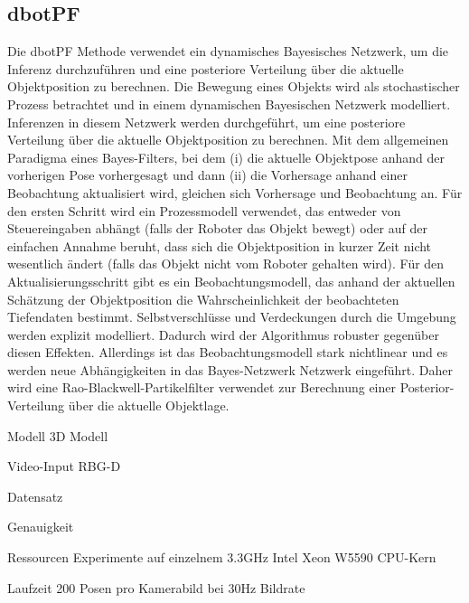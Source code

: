 \documentclass[a4paper, 11pt]{article}
\begin{document}
\begin{multicols*}{2}
    \subsection{dbotPF}
    Die dbotPF\cite{dbotPF} Methode verwendet ein dynamisches Bayesisches Netzwerk, um die Inferenz durchzuführen und eine posteriore Verteilung über die aktuelle Objektposition zu berechnen.
    Die Bewegung eines Objekts wird als stochastischer Prozess betrachtet und in einem dynamischen Bayesischen Netzwerk modelliert. Inferenzen in diesem Netzwerk werden durchgeführt, um eine posteriore Verteilung über die aktuelle Objektposition zu berechnen.
    Mit dem allgemeinen Paradigma eines Bayes-Filters, bei dem (i) die aktuelle Objektpose anhand der vorherigen Pose vorhergesagt und dann (ii) die Vorhersage anhand einer Beobachtung aktualisiert wird, gleichen sich Vorhersage und Beobachtung an.
    Für den ersten Schritt wird ein Prozessmodell verwendet, das entweder von Steuereingaben abhängt (falls der Roboter das Objekt bewegt) oder auf der einfachen Annahme beruht, dass sich die Objektposition in kurzer Zeit nicht wesentlich ändert (falls das Objekt nicht vom Roboter gehalten wird).
    Für den Aktualisierungsschritt gibt es ein Beobachtungsmodell, das anhand der aktuellen Schätzung der Objektposition die Wahrscheinlichkeit der beobachteten Tiefendaten bestimmt. Selbstverschlüsse und Verdeckungen durch die Umgebung werden explizit modelliert. Dadurch wird der Algorithmus robuster gegenüber diesen Effekten.
    Allerdings ist das Beobachtungsmodell stark nichtlinear und es werden neue Abhängigkeiten in das Bayes-Netzwerk Netzwerk eingeführt. Daher wird eine Rao-Blackwell-Partikelfilter\cite{blackwellised} verwendet zur Berechnung einer Posterior-Verteilung über die aktuelle Objektlage.

    \begin{description*}
        \item[Modell] 3D Modell
        \item[Video-Input] RBG-D
        \item[Datensatz]
        \item[Genauigkeit]
        \item[Ressourcen] Experimente auf einzelnem 3.3GHz Intel Xeon W5590 CPU-Kern
        \item[Laufzeit] 200 Posen pro Kamerabild bei 30Hz Bildrate
    \end{description*}


\end{multicols*}
\end{document}
